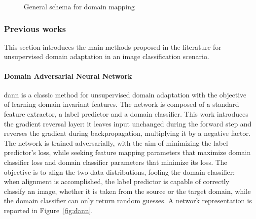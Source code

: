 \documentclass[%
    corpo=12pt,
    twoside,
    stile=classica,   
    tipotesi=magistrale,
    evenboxes,
    english
]{toptesi}
\begin{document}
\begin{figure}[ht]
	\centering
	\caption{General schema for domain mapping\cite{wilson2020survey}}
	\label{fig:gan}
\end{figure}


\subsubsection{Previous works}
This section introduces the main methods proposed in the literature for unsupervised domain adaptation in an image classification scenario.

\paragraph{Domain Adversarial Neural Network}\label{sec:dann}
\gls{dann}\cite{ganin2015unsupervised} is a classic method for un\-su\-per\-vi\-sed domain adaptation with the objective of learning domain invariant features. The network is composed of a standard feature extractor, a label predictor and a domain classifier. This work introduces the gradient reversal layer: it leaves input unchanged during the forward step and reverses the gradient during backpropagation, multiplying it by a negative factor. The network is trained adversarially, with the aim of minimizing the label predictor’s loss, while seeking feature mapping parameters that maximize domain classifier loss and domain classifier parameters that minimize its loss. The objective is to align the two data distributions, fooling the domain classifier: when alignment is accomplished, the label predictor is capable of correctly classify an image, whether it is taken from the source or the target domain, while the domain classifier can only return random guesses. A network representation is reported in Figure~\ref{fig:dann}.
\end{document}
